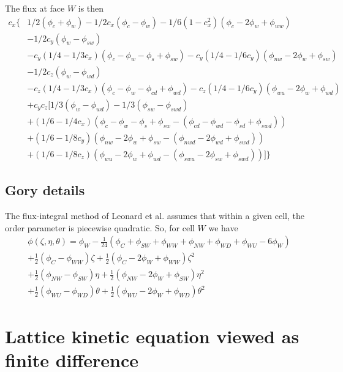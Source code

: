 The flux at face $W$ is then
\[\begin{array}{ll}
c_x \Big\{ &
1/2(\phi_c + \phi_w) - 1/2c_x (\phi_c - \phi_w)
 - 1/6 (1 -c_x^2)(\phi_c - 2\phi_w + \phi_{ww})\\
& - 1/2c_y (\phi_w - \phi_{sw})\\
& - c_y (1/4 - 1/3c_x)(\phi_c - \phi_w - \phi_s + \phi_{sw})
 - c_y (1/4 - 1/6c_y)(\phi_{nw} - 2\phi_w + \phi_{sw})\\
& - 1/2c_z (\phi_w - \phi_{wd}) \\
& - c_z (1/4 - 1/3c_x) (\phi_c - \phi_w -\phi_{cd} + \phi_{wd})
 - c_z (1/4 - 1/6 c_y) (\phi_{wu} - 2 \phi_w + \phi_{wd}) \\
& + c_y c_z \big[
1/3(\phi_w - \phi_{wd}) - 1/3 (\phi_{sw} - \phi_{swd}) \\
& + (1/6 - 1/4c_x) (\phi_c - \phi_w -\phi_s + \phi_{sw}
    -(\phi_{cd} - \phi_{wd} - \phi_{sd} + \phi_{swd}))\\
& + (1/6 - 1/8c_y)(\phi_{nw} - 2 \phi_w + \phi_{sw} 
                - (\phi_{nwd} - 2\phi_{wd} + \phi_{swd}))\\
& + (1/6 - 1/8c_z)(\phi_{wu} - 2\phi_w + \phi_{wd}
                 - (\phi_{swu} - 2\phi_{sw} + \phi_{swd}))\big] \Big\}
\end{array}\]

\subsection{Gory details}

The flux-integral method of Leonard et al. assumes that within a
given cell, the order parameter is piecewise quadratic. So, for
cell $W$ we have
\begin{eqnarray}
\phi (\zeta, \eta, \theta) = \phi_W - {\scriptstyle \frac{1}{24}} 
(\phi_C + \phi_{SW} + \phi_{WW} + \phi_{NW} + \phi_{WD} + \phi_{WU}
- 6\phi_W)\\
+ {\scriptstyle \frac{1}{2}} (\phi_C - \phi_{WW}) \zeta
+ {\scriptstyle \frac{1}{2}} (\phi_C - 2\phi_{W} + \phi_{WW}) \zeta^2\\
+ {\scriptstyle \frac{1}{2}} (\phi_{NW} - \phi_{SW}) \eta
+ {\scriptstyle \frac{1}{2}} (\phi_{NW} - 2\phi_{W} + \phi_{SW}) \eta^2\\
+ {\scriptstyle \frac{1}{2}} (\phi_{WU} - \phi_{WD}) \theta
+ {\scriptstyle \frac{1}{2}} (\phi_{WU} - 2\phi_{W} + \phi_{WD}) \theta^2
\end{eqnarray}


\section{Lattice kinetic equation viewed as finite difference}

